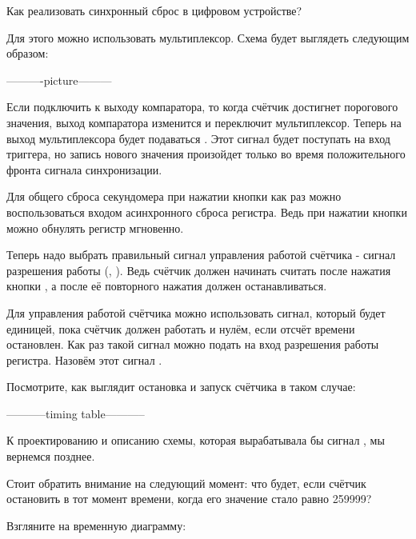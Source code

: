 \par{Как реализовать синхронный сброс в цифровом устройстве?}

\par{Для этого можно использовать мультиплексор. Схема будет выглядеть следующим образом:}

\par{----------picture---------}

\par{Если подключить  к выходу компаратора, то когда счётчик достигнет порогового значения, выход компаратора изменится и переключит мультиплексор. Теперь на выход мультиплексора будет подаваться . Этот сигнал будет поступать на вход триггера, но запись нового значения произойдет только во время положительного фронта сигнала синхронизации.}

\par{Для общего сброса секундомера при нажатии кнопки  как раз можно воспользоваться входом асинхронного сброса регистра. Ведь при нажатии кнопки  можно обнулять регистр мгновенно.}

\par{Теперь надо выбрать правильный сигнал управления работой счётчика - сигнал разрешения работы (, ). Ведь счётчик должен начинать считать после нажатия кнопки , а после её повторного нажатия должен останавливаться.}

\par{Для управления работой счётчика можно использовать сигнал, который будет единицей, пока счётчик должен работать и нулём, если отсчёт времени остановлен. Как раз такой сигнал можно подать на вход разрешения работы регистра. Назовём этот сигнал .}

\par{Посмотрите, как выглядит остановка и запуск счётчика в таком случае:}

\par{-----------timing table-----------}

\par{К проектированию и описанию схемы, которая вырабатывала бы сигнал , мы вернемся позднее.}

\par{Стоит обратить внимание на следующий момент: что будет, если счётчик остановить в тот момент времени, когда его значение стало равно 259999?}

\par{Взгляните на временную диаграмму:}

